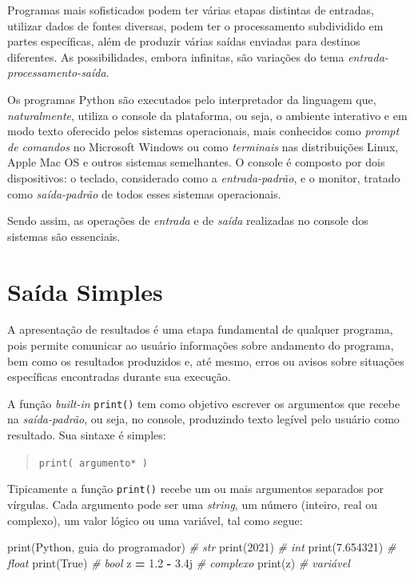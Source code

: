 \documentclass[
]{book}
\newenvironment{Shaded}{\begin{snugshade}}{\end{snugshade}}
\newcommand{\BuiltInTok}[1]{#1}
\newcommand{\CommentTok}[1]{\textcolor[rgb]{0.56,0.35,0.01}{\textit{#1}}}
\newcommand{\DecValTok}[1]{\textcolor[rgb]{0.00,0.00,0.81}{#1}}
\newcommand{\FloatTok}[1]{\textcolor[rgb]{0.00,0.00,0.81}{#1}}
\newcommand{\NormalTok}[1]{#1}
\newcommand{\OperatorTok}[1]{\textcolor[rgb]{0.81,0.36,0.00}{\textbf{#1}}}
\newcommand{\OtherTok}[1]{\textcolor[rgb]{0.56,0.35,0.01}{#1}}
\newcommand{\StringTok}[1]{\textcolor[rgb]{0.31,0.60,0.02}{#1}}
\newcommand{\VariableTok}[1]{\textcolor[rgb]{0.00,0.00,0.00}{#1}}
\begin{document}
Programas mais sofisticados podem ter várias etapas distintas de entradas, utilizar dados de fontes diversas, podem ter o processamento subdividido em partes específicas, além de produzir várias saídas enviadas para destinos diferentes. As possibilidades, embora infinitas, são variações do tema \emph{entrada-processamento-saída}.

Os programas Python são executados pelo interpretador da linguagem que, \emph{naturalmente}, utiliza o console da plataforma, ou seja, o ambiente interativo e em modo texto oferecido pelos sistemas operacionais, mais conhecidos como \emph{prompt de comandos} no Microsoft Windows ou como \emph{terminais} nas distribuições Linux, Apple Mac OS e outros sistemas semelhantes. O console é composto por dois dispositivos: o teclado, considerado como a \emph{entrada-padrão}, e o monitor, tratado como \emph{saída-padrão} de todos esses sistemas operacionais.

Sendo assim, as operações de \emph{entrada} e de \emph{saída} realizadas no console dos sistemas são essenciais.

\hypertarget{e-s-saida}{%
\section{Saída Simples}\label{e-s-saida}}

A apresentação de resultados é uma etapa fundamental de qualquer programa, pois permite comunicar ao usuário informações sobre andamento do programa, bem como os resultados produzidos e, até mesmo, erros ou avisos sobre situações específicas encontradas durante sua execução.

A função \emph{built-in} \texttt{print()} tem como objetivo escrever os argumentos que recebe na \emph{saída-padrão}, ou seja, no console, produzindo texto legível pelo usuário como resultado. Sua sintaxe é simples:

\begin{quote}
\texttt{print(\ argumento*\ )}
\end{quote}

Tipicamente a função \texttt{print()} recebe um ou mais argumentos separados por vírgulas. Cada argumento pode ser uma \emph{string}, um número (inteiro, real ou complexo), um valor lógico ou uma variável, tal como segue:

\begin{Shaded}
\begin{Highlighting}[]
\BuiltInTok{print}\NormalTok{(}\StringTok{\textquotesingle{}Python, guia do programador\textquotesingle{}}\NormalTok{) }\CommentTok{\# str}
\BuiltInTok{print}\NormalTok{(}\DecValTok{2021}\NormalTok{) }\CommentTok{\# int}
\BuiltInTok{print}\NormalTok{(}\FloatTok{7.654321}\NormalTok{) }\CommentTok{\# float}
\BuiltInTok{print}\NormalTok{(}\VariableTok{True}\NormalTok{) }\CommentTok{\# bool}
\NormalTok{z }\OperatorTok{=} \FloatTok{1.2} \OperatorTok{{-}} \OtherTok{3.4j} \CommentTok{\# complexo}
\BuiltInTok{print}\NormalTok{(z) }\CommentTok{\# variável}
\end{Highlighting}
\end{Shaded}
\end{document}
